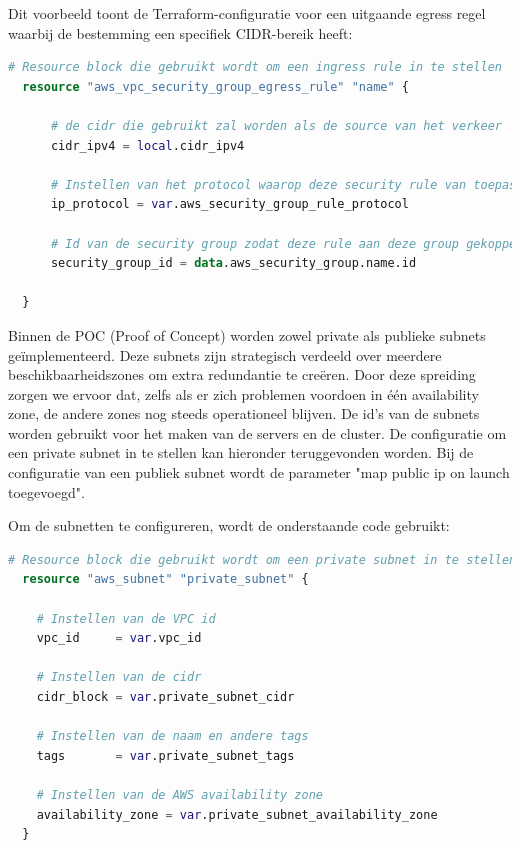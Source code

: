 \vspace{0.5cm}

Dit voorbeeld toont de Terraform-configuratie voor een uitgaande egress regel waarbij de bestemming een specifiek CIDR-bereik heeft:
\newline

\begin{lstlisting}[language=terraform]  
  # Resource block die gebruikt wordt om een ingress rule in te stellen
  resource "aws_vpc_security_group_egress_rule" "name" {
  
      # de cidr die gebruikt zal worden als de source van het verkeer
      cidr_ipv4 = local.cidr_ipv4
      
      # Instellen van het protocol waarop deze security rule van toepassing is tcp/udp of -1 voor beide
      ip_protocol = var.aws_security_group_rule_protocol
  
      # Id van de security group zodat deze rule aan deze group gekoppeld kan worden
      security_group_id = data.aws_security_group.name.id
    
  }
\end{lstlisting}
\clearpage

Binnen de POC (Proof of Concept) worden zowel private als publieke subnets geïmplementeerd. Deze subnets zijn strategisch verdeeld over meerdere beschikbaarheidszones om extra redundantie te creëren. Door deze spreiding zorgen we ervoor dat, zelfs als er zich problemen voordoen in één availability zone, de andere zones nog steeds operationeel blijven. De id's van de subnets worden gebruikt voor het maken van de servers en de cluster. De configuratie om een private subnet in te stellen kan hieronder teruggevonden worden. Bij de configuratie van een publiek subnet wordt de parameter "map public ip on launch toegevoegd".
\newline

Om de subnetten te configureren, wordt de onderstaande code gebruikt:
\newline

\begin{lstlisting}[language=terraform]  
  # Resource block die gebruikt wordt om een private subnet in te stellen
  resource "aws_subnet" "private_subnet" {
  
    # Instellen van de VPC id
    vpc_id     = var.vpc_id
  
    # Instellen van de cidr
    cidr_block = var.private_subnet_cidr
  
    # Instellen van de naam en andere tags
    tags       = var.private_subnet_tags
  
    # Instellen van de AWS availability zone
    availability_zone = var.private_subnet_availability_zone
  } 
\end{lstlisting}

